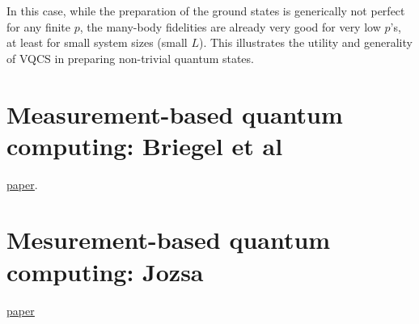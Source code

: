 \documentclass{book}
\theoremstyle{definition}
\begin{document}
In this case, while the preparation of the ground states is generically not perfect for any finite $p$, the many-body fidelities are already very good for very low $p$'s, at least for small system sizes (small $L$). This illustrates the utility and generality of VQCS in preparing non-trivial quantum states. 





%
%
%






\newpage



\section{Measurement-based quantum computing: Briegel et al}

\href{https://www.nature.com/articles/nphys1157.pdf}{\underline{paper}}.


\newpage


\section{Mesurement-based quantum computing: Jozsa}




\href{https://arxiv.org/pdf/quant-ph/0508124.pdf}{\underline{paper}}
\end{document}
